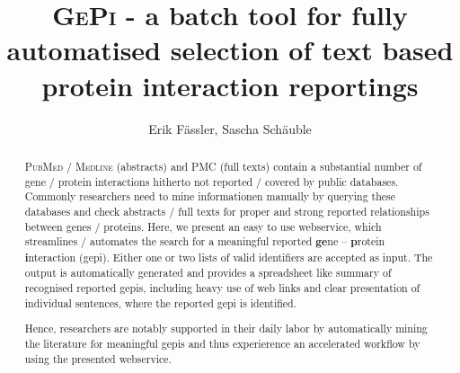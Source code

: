 \documentclass[a4paper,10pt]{article}
\title{\textsc{GePi} - a batch tool for fully automatised selection of text based protein interaction reportings}
\author{Erik F\"assler, Sascha Sch\"auble}
\affil{JULIE Lab, FSU Jena}
\begin{document}
  \maketitle
  
  \begin{abstract}
    \textsc{PubMed} / \textsc{Medline} (abstracts) and \textsc{PMC} (full texts) contain a substantial number of gene / protein interactions hitherto not reported / covered by public databases. Commonly researchers need to mine informationen manually by querying these databases and check abstracts / full texts for proper and strong reported relationships between genes / proteins. Here, we present an easy to use webservice, which streamlines / automates the search for a meaningful reported \textbf{ge}ne -- \textbf{p}rotein \textbf{i}nteraction (gepi). Either one or two lists of valid identifiers are accepted as input. The output is automatically generated and provides a spreadsheet like summary of recognised reported gepis, including heavy use of web links and clear presentation of individual sentences, where the reported gepi is identified.
    
    Hence, researchers are notably supported in their daily labor by automatically mining the literature for meaningful gepis and thus experierence an accelerated workflow by using the presented webservice.
  \end{abstract}
  
  \newpage
\end{document}
